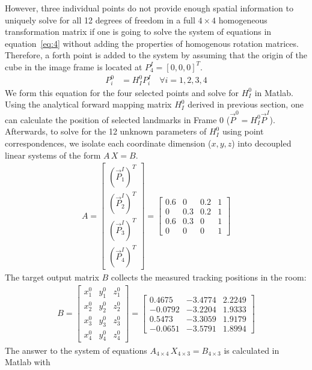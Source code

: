 \documentclass[12pt, a4paper]{article}
\begin{document}
However, three individual points do not provide enough spatial information to uniquely solve for all 12 degrees of freedom in a full $4\times4$ homogeneous transformation matrix if one is going to solve the system of equations in equation~\ref{eq:4} without adding the properties of homogenous rotation matrices. Therefore, a forth point is added to the system by assuming that the origin of the cube in the image frame is located at $P_4^I = [0, 0, 0]^T$.
\begin{align}
	P_i^0 & = H_I^0 P_i^I \quad \forall i = 1,2,3,4 \label{eq:4}
\end{align}
We form this equation for the four selected points and solve for \(H_I^0\) in Matlab.
Using the analytical forward mapping matrix $H_I^0$ derived in previous section, one can calculate the position of selected landmarks in Frame 0 ($\vec{P}^0 = H_I^0 \vec{P}^I$).
Afterwards, to solve for the 12 unknown parameters of $H_I^0$ using point correspondences, we isolate each coordinate dimension ($x, y, z$) into decoupled linear systems of the form $A \, X = B$.
\begin{align*}
	A = \begin{bmatrix}
		    (\vec{P}_1^I)^T \\ (\vec{P}_2^I)^T \\ (\vec{P}_3^I)^T \\ (\vec{P}_4^I)^T
	    \end{bmatrix} =
	\begin{bmatrix}
		0.6 & 0   & 0.2 & 1 \\
		0   & 0.3 & 0.2 & 1 \\
		0.6 & 0.3 & 0   & 1 \\
		0   & 0   & 0   & 1
	\end{bmatrix}
\end{align*}
The target output matrix $B$ collects the measured tracking positions in the room:
\begin{align}
	B = \begin{bmatrix} x_{1}^0 & y_{1}^0 & z_{1}^0 \\ x_{2}^0 & y_{2}^0 & z_{2}^0 \\ x_{3}^0 & y_{3}^0 & z_{3}^0 \\ x_{4}^0 & y_{4}^0 & z_{4}^0 \end{bmatrix} =
	\begin{bmatrix}
		0.4675 & -3.4774 & 2.2249 \\
		-0.0792 & -3.2204 & 1.9333 \\
		0.5473 & -3.3059 & 1.9179 \\
		-0.0651 & -3.5791 & 1.8994
	\end{bmatrix}
\end{align}
The answer to the system of equations $A_{4\times4} \, X_{4\times3} = B_{4\times3}$ is calculated in Matlab with
\end{document}
